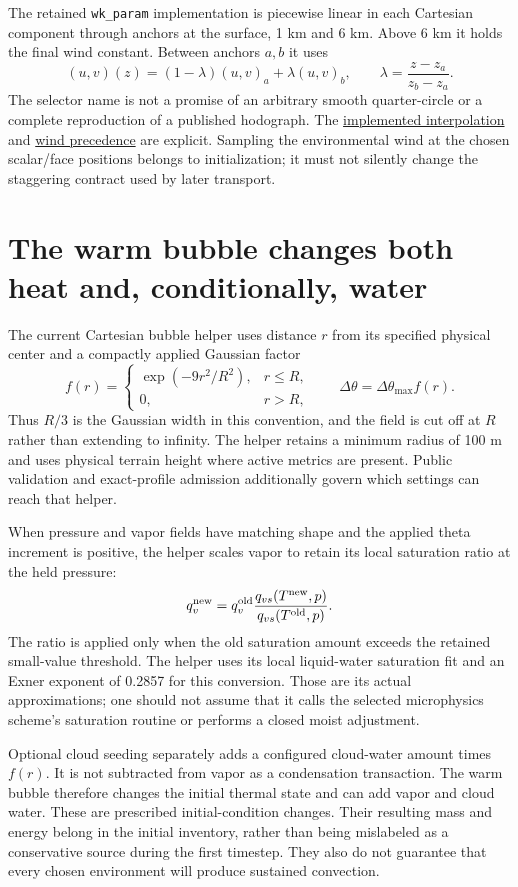 The retained \texttt{wk\_param} implementation is piecewise linear in each
Cartesian component through anchors at the surface, 1 km and 6 km. Above 6 km
it holds the final wind constant. Between anchors $a,b$ it uses
\[
 (u,v)(z)=(1-\lambda)(u,v)_a+\lambda(u,v)_b,
 \qquad\lambda=\frac{z-z_a}{z_b-z_a}.
\]
The selector name is not a promise of an arbitrary smooth quarter-circle or a
complete reproduction of a published hodograph. The
\href{../src/init/hodograph/sources/wk_param.cpp}{implemented interpolation}
and \href{../src/init/hodograph/factory.cpp}{wind precedence} are explicit.
Sampling the environmental wind at the chosen scalar/face positions belongs to
initialization; it must not silently change the staggering contract used by
later transport.

\section{The warm bubble changes both heat and, conditionally, water}

The current Cartesian bubble helper uses distance $r$ from its specified
physical center and a compactly applied Gaussian factor
\[
 f(r)=\begin{cases}
       \exp(-9r^2/R^2),&r\le R,\\
       0,&r>R,
      \end{cases}
 \qquad\Delta\theta=\Delta\theta_{\max}f(r).
\]
Thus $R/3$ is the Gaussian width in this convention, and the field is cut off
at $R$ rather than extending to infinity. The helper retains a minimum radius
of 100 m and uses physical terrain height where active metrics are present.
Public validation and exact-profile admission additionally govern which settings
can reach that helper.

When pressure and vapor fields have matching shape and the applied theta
increment is positive, the helper scales vapor to retain its local saturation
ratio at the held pressure:
\[
 q_v^{\rm new}=q_v^{\rm old}
       \frac{q_{vs}(T^{\rm new},p)}{q_{vs}(T^{\rm old},p)}.
\]
The ratio is applied only when the old saturation amount exceeds the retained
small-value threshold. The helper uses its local liquid-water saturation fit
and an Exner exponent of 0.2857 for this conversion. Those are its actual
approximations; one should not assume that it calls the selected microphysics
scheme's saturation routine or performs a closed moist adjustment.

Optional cloud seeding separately adds a configured cloud-water amount times
$f(r)$. It is not subtracted from vapor as a condensation transaction. The warm
bubble therefore changes the initial thermal state and can add vapor and cloud
water. These are prescribed initial-condition changes. Their resulting mass and
energy belong in the initial inventory, rather than being mislabeled as a
conservative source during the first timestep. They also do not guarantee that
every chosen environment will produce sustained convection.

